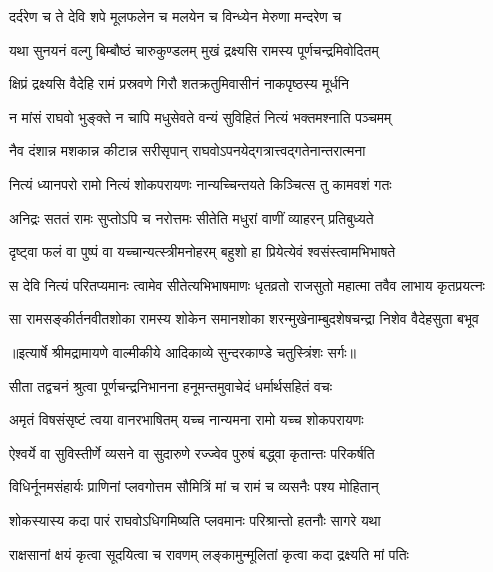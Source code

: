 \twolineshloka
{दर्दरेण च ते देवि शपे मूलफलेन च}
{मलयेन च विन्ध्येन मेरुणा मन्दरेण च} %

\twolineshloka
{यथा सुनयनं वल्गु बिम्बौष्ठं चारुकुण्डलम्}
{मुखं द्रक्ष्यसि रामस्य पूर्णचन्द्रमिवोदितम्} %

\twolineshloka
{क्षिप्रं द्रक्ष्यसि वैदेहि रामं प्रस्रवणे गिरौ}
{शतक्रतुमिवासीनं नाकपृष्ठस्य मूर्धनि} %

\twolineshloka
{न मांसं राघवो भुङ्क्ते न चापि मधुसेवते}
{वन्यं सुविहितं नित्यं भक्तमश्नाति पञ्चमम्} %

\twolineshloka
{नैव दंशान्न मशकान्न कीटान्न सरीसृपान्}
{राघवोऽपनयेद्गत्रात्त्वद्गतेनान्तरात्मना} %

\twolineshloka
{नित्यं ध्यानपरो रामो नित्यं शोकपरायणः}
{नान्यच्चिन्तयते किञ्चित्स तु कामवशं गतः} %

\twolineshloka
{अनिद्रः सततं रामः सुप्तोऽपि च नरोत्तमः}
{सीतेति मधुरां वाणीं व्याहरन् प्रतिबुध्यते} %

\twolineshloka
{दृष्ट्वा फलं वा पुष्पं वा यच्चान्यत्स्त्रीमनोहरम्}
{बहुशो हा प्रियेत्येवं श्वसंस्त्वामभिभाषते} %

\fourlineindentedshloka
{स देवि नित्यं परितप्यमानः}
{त्वामेव सीतेत्यभिभाषमाणः}
{धृतव्रतो राजसुतो महात्मा}
{तवैव लाभाय कृतप्रयत्नः} %

\fourlineindentedshloka
{सा रामसङ्कीर्तनवीतशोका}
{रामस्य शोकेन समानशोका}
{शरन्मुखेनाम्बुदशेषचन्द्रा}
{निशेव वैदेहसुता बभूव} %


{॥इत्यार्षे श्रीमद्रामायणे वाल्मीकीये आदिकाव्ये सुन्दरकाण्डे चतुस्त्रिंशः सर्गः॥}


\twolineshloka
{सीता तद्वचनं श्रुत्वा पूर्णचन्द्रनिभानना}
{हनूमन्तमुवाचेदं धर्मार्थसहितं वचः} %

\twolineshloka
{अमृतं विषसंसृष्टं त्वया वानरभाषितम्}
{यच्च नान्यमना रामो यच्च शोकपरायणः} %

\twolineshloka
{ऐश्वर्ये वा सुविस्तीर्णे व्यसने वा सुदारुणे}
{रज्ज्वेव पुरुषं बद्ध्वा कृतान्तः परिकर्षति} %

\twolineshloka
{विधिर्नूनमसंहार्यः प्राणिनां प्लवगोत्तम}
{सौमित्रिं मां च रामं च व्यसनैः पश्य मोहितान्} %

\twolineshloka
{शोकस्यास्य कदा पारं राघवोऽधिगमिष्यति}
{प्लवमानः परिश्रान्तो हतनौः सागरे यथा} %

\twolineshloka
{राक्षसानां क्षयं कृत्वा सूदयित्वा च रावणम्}
{लङ्कामुन्मूलितां कृत्वा कदा द्रक्ष्यति मां पतिः} %

